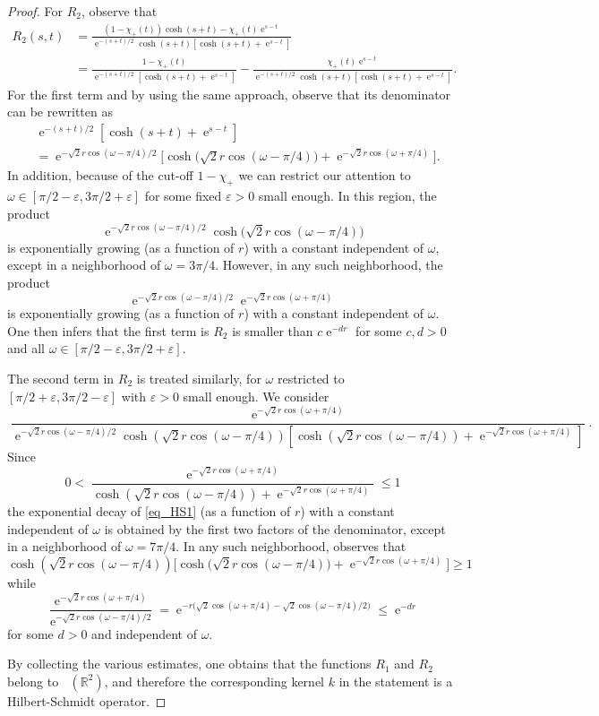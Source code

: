 \documentclass[11pt]{article}
\def\R{\mathbb R}
\def\e{\mathop{\mathrm{e}}\nolimits}
\def\ltwo{\mathop{\mathrm{L}^2}\nolimits}
\begin{document}
\begin{proof}
For $R_2$, observe that
\begin{align*}
R_2(s,t) & = \frac{(1-\chi_+(t))\cosh(s+t)-\chi_+(t)\e^{s-t}}{\e^{-(s+t)/2}\cosh(s+t)[\cosh(s+t)+\e^{s-t}]} \\
& = \frac{1-\chi_+(t)}{\e^{-(s+t)/2}[\cosh(s+t)+\e^{s-t}]}-\frac{\chi_+(t)\e^{s-t}}{\e^{-(s+t)/2}\cosh(s+t)[\cosh(s+t)+\e^{s-t}]}.
\end{align*}
For the first term and by using the same approach, observe that its denominator
can be rewritten as
\begin{align*}
&\e^{-(s+t)/2}[\cosh(s+t)+\e^{s-t}] \\
&=\e^{-\sqrt{2}r\cos(\omega-\pi/4)/2}
\big[\cosh\big(\sqrt{2}r \cos(\omega-\pi/4)\big)+\e^{-\sqrt{2}r\cos(\omega+\pi/4)}\big].
\end{align*}
In addition, because of the cut-off $1-\chi_+$ we can restrict our attention
to $\omega \in [\pi/2-\varepsilon,3\pi/2+\varepsilon]$ for some fixed $\varepsilon>0$
small enough.  In this region, the product 
$$
\e^{-\sqrt{2}r\cos(\omega-\pi/4)/2} \cosh\big(\sqrt{2}r \cos(\omega-\pi/4)\big)
$$ 
is exponentially growing (as a function of $r$) with a constant independent of $\omega$, except in a neighborhood of $\omega=3\pi/4$.
However, in any such neighborhood, the product
$$
\e^{-\sqrt{2}r\cos(\omega-\pi/4)/2}\e^{-\sqrt{2}r\cos(\omega+\pi/4)}
$$
is exponentially growing (as a function of $r$) with a constant independent of $\omega$.
One then infers that the first term is $R_2$ is smaller than $c\e^{-dr}$ for some
$c,d>0$ and all $\omega \in [\pi/2-\varepsilon,3\pi/2+\varepsilon]$.

The second term in $R_2$ is treated similarly, for $\omega$ restricted to $[\pi/2+\varepsilon,3\pi/2-\varepsilon]$ with  $\varepsilon>0$
small enough.  We consider
\begin{equation}\label{eq_HS1}
\frac{\e^{-\sqrt{2}r\cos(\omega+\pi/4)}}{\e^{-\sqrt{2}r\cos(\omega-\pi/4)/2}\cosh(\sqrt{2}r\cos(\omega-\pi/4))[\cosh(\sqrt{2}r\cos(\omega-\pi/4))+\e^{-\sqrt{2}r\cos(\omega+\pi/4)}]}.
\end{equation}
Since
$$
0<\frac{\e^{-\sqrt{2}r\cos(\omega+\pi/4)}}{\cosh(\sqrt{2}r\cos(\omega-\pi/4))+\e^{-\sqrt{2}r\cos(\omega+\pi/4)}}\leq 1
$$
the exponential decay of \eqref{eq_HS1} (as a function of $r$) with a constant independent of $\omega$ is obtained by the first two factors of the denominator, except in a neighborhood of $\omega=7\pi/4$. In any such neighborhood, observes that
$$
\cosh(\sqrt{2}r\cos(\omega-\pi/4))\big[\cosh\big(\sqrt{2}r\cos(\omega-\pi/4)\big)+\e^{-\sqrt{2}r\cos(\omega+\pi/4)}\big]\geq 1
$$
while 
$$
\frac{\e^{-\sqrt{2}r\cos(\omega+\pi/4)}}{\e^{-\sqrt{2}r\cos(\omega-\pi/4)/2}}
= \e^{-r\big(\sqrt{2}\cos(\omega+\pi/4)-\sqrt{2}\cos(\omega-\pi/4)/2\big)}\leq \e^{-dr}
$$
for some $d>0$ and independent of $\omega$.

By collecting the various estimates, one obtains that the functions $R_1$ and $R_2$ belong 
to $\ltwo(\R^2)$, and therefore the corresponding kernel $k$ in the statement is a Hilbert-Schmidt operator.
\end{proof}
\end{document}
